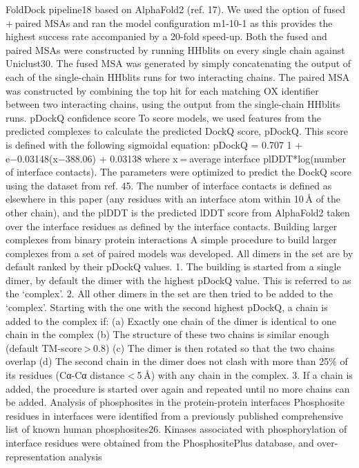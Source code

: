 FoldDock pipeline18 based on AlphaFold2 (ref. 17). We used the option
of fused + paired MSAs and ran the model configuration m1-10-1 as this
provides the highest success rate accompanied by a 20-fold speed-up.
Both the fused and paired MSAs were constructed by running HHblits
on every single chain against Uniclust30. The fused MSA was generated
by simply concatenating the output of each of the single-chain HHblits
runs for two interacting chains. The paired MSA was constructed by
combining the top hit for each matching OX identifier between two
interacting chains, using the output from the single-chain HHblits runs.
pDockQ confidence score
To score models, we used features from the predicted complexes to
calculate the predicted DockQ score, pDockQ. This score is defined
with the following sigmoidal equation:
pDockQ =
0.707
1 + e−0.03148(x−388.06) + 0.03138
where
x = average interface plDDT*log(number of interface contacts).
The parameters were optimized to predict the DockQ score using
the dataset from ref. 45. The number of interface contacts is defined as
elsewhere in this paper (any residues with an interface atom within
10 Å of the other chain), and the plDDT is the predicted lDDT score
from AlphaFold2 taken over the interface residues as defined by the
interface contacts.
Building larger complexes from binary protein interactions
A simple procedure to build larger complexes from a set of paired
models was developed. All dimers in the set are by default ranked by
their pDockQ values.
	1.
The building is started from a single dimer, by default the
dimer with the highest pDockQ value. This is referred to as
the ‘complex’.
	2.
All other dimers in the set are then tried to be added to the
‘complex’. Starting with the one with the second highest
pDockQ, a chain is added to the complex if:
	(a)	Exactly one chain of the dimer is identical to one chain in the
complex
	(b)	The structure of these two chains is similar enough (default
TM-score > 0.8)
	(c)	The dimer is then rotated so that the two chains overlap
	(d)	The second chain in the dimer does not clash with more than
25\% of its residues (Cα-Cα distance < 5 Å) with any chain in the
complex.
	3.
If a chain is added, the procedure is started over again and
repeated until no more chains can be added.
Analysis of phosphosites in the protein-protein interfaces
Phosphosite residues in interfaces were identified from a previously
published comprehensive list of known human phosphosites26. Kinases
associated with phosphorylation of interface residues were obtained
from the PhosphositePlus database, and over-representation analysis
